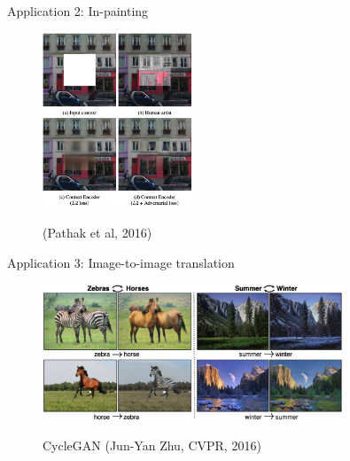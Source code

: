 \documentclass[8pt,xcolor=table,aspectratio=169]{beamer}
\begin{document}
\begin{frame}{Application 2: In-painting}

\begin{figure}
\centering
\includegraphics[width=0.4\textwidth]{jVHlxgt.png}

(Pathak et al, 2016)
\end{figure}

\end{frame}

\begin{frame}{Application 3: Image-to-image translation}

\begin{figure}
\centering
\includegraphics[width=0.8\textwidth]{nxAE9YJ.jpg}

CycleGAN (Jun-Yan Zhu, CVPR, 2016)
\end{figure}

\end{frame}
\end{document}
